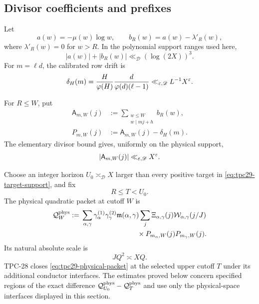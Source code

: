 \subsection{Divisor coefficients and prefixes}

Let
\begin{equation}
 a(w)=-\mu(w)\log w,
 \qquad
 b_R(w)=a(w)-\lambda'_R(w),
 \label{eq:tpc29-coefficients}
\end{equation}
where $\lambda'_R(w)=0$ for $w>R$.  In the polynomial support ranges
used here,
\begin{equation}
 |a(w)|+|b_R(w)|\ll_{\mathscr D}(\log(2X))^3.
 \label{eq:tpc29-coefficient-envelope}
\end{equation}
For $m=\ell d$, the calibrated row drift is
\begin{equation}
 \delta_H(m)
 =\frac H{\varphi(H)}\frac d{\varphi(d)(\ell-1)}
 \ll_{\varepsilon,\mathscr D}L^{-1}X^\varepsilon.
 \label{eq:tpc29-row-drift}
\end{equation}

For $R\le W$, put
\begin{align}
 \mathsf A_{m,W}(j)
 &:=\sum_{\substack{w\le W\\w\mid mj+h}}b_R(w),
 \label{eq:tpc29-raw-prefix}\\
 P_{m,W}(j)&:=\mathsf A_{m,W}(j)-\delta_H(m).
 \label{eq:tpc29-calibrated-prefix}
\end{align}
The elementary divisor bound gives, uniformly on the physical support,
\begin{equation}
 |\mathsf A_{m,W}(j)|
 \ll_{\varepsilon,\mathscr D}X^\varepsilon.
 \label{eq:tpc29-prefix-pointwise}
\end{equation}

Choose an integer horizon $U_0\asymp_{\mathscr D}X$ larger than every
positive target in \eqref{eq:tpc29-target-support}, and fix
\begin{equation}
 R\le T<U_0.
 \label{eq:tpc29-cutoffs}
\end{equation}
The physical quadratic packet at cutoff $W$ is
\begin{align}
 \mathcal Q_W^{\rm phys}
 :={}&\sum_{\alpha,\gamma}
 \gamma_\alpha^{(1)}\gamma_\gamma^{(2)}
 \mathfrak m(\alpha,\gamma)
 \sum_j\Xi_{\alpha,\gamma}(j)
 \mathcal W_{\alpha,\gamma}(j/J)
 \notag\\
 &\hspace{8em}\times
 P_{m_\alpha,W}(j)P_{m_\gamma,W}(j).
 \label{eq:tpc29-physical-packet}
\end{align}
Its natural absolute scale is
\begin{equation}
 JQ^2\asymp XQ.
 \label{eq:tpc29-natural-scale}
\end{equation}
TPC-28 closes \eqref{eq:tpc29-physical-packet} at the selected upper
cutoff $T$ under its additional conductor interfaces.  The estimates
proved below concern specified regions of the exact difference
$\mathcal Q_{U_0}^{\rm phys}-\mathcal Q_T^{\rm phys}$ and use only the physical-space
interfaces displayed in this section.
